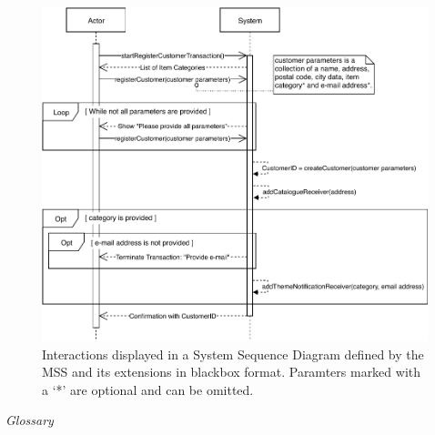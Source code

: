 \begin{figure}[H]
	\centering
	\includegraphics[scale=1]{uml/SD-bb-regcust.pdf}
	\caption*{Interactions displayed in a System Sequence Diagram defined by the MSS and its extensions in blackbox format. Paramters marked with a `*' are optional and can be omitted.}
\end{figure}
\textsl{Glossary}
